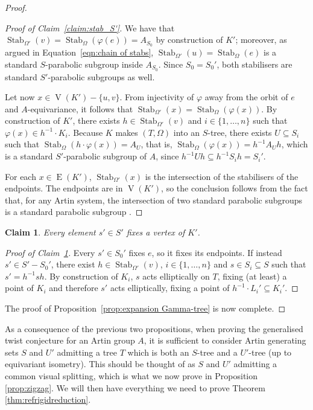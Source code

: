 \documentclass[svgnames]{amsart}
\theoremstyle{plain}
\newtheorem{claim}[thm]{Claim}
\theoremstyle{definition}
\newenvironment{claimproof}{\renewcommand{\qedsymbol}{$\blacksquare$}\begin{proof}}{\end{proof}}
\newcommand{\edge}[1]{\operatorname{E}(#1)}
\newcommand{\Stab}[2]{\operatorname{Stab}_{#1}\left(#2\right)}
\renewcommand{\phi}{\varphi}
\newcommand{\ver}[1]{\operatorname{V}(#1)}
\begin{document}
\begin{proof}
\begin{claimproof}[Proof of Claim~\ref{claim:stab_S'}]
    We have that $\Stab{\Omega'}{v}=\Stab{\Omega}{\phi(e)}=A_{S_0}$ by construction of $K'$; moreover, as argued in Equation~\eqref{eqn:chain of stabs},  $\Stab{\Omega'} u=\Stab{\Omega} e$ is a standard $S$-parabolic subgroup inside $A_{S_0}$. Since $S_0=S_0'$, both stabilisers are standard $S'$-parabolic subgroups as well.\par
    Let now $x\in\ver{K'}-\{u,v\}$. From injectivity of $\phi$ away from the orbit of $e$ and $A$-equivariance, it follows that $\Stab{\Omega'}{x}=\Stab{\Omega}{\phi(x)}$. By construction of $K'$, there exists $h\in\Stab{\Omega'}{v}$ and $i\in\{1,\dots,n\}$ such that $\phi(x) \in h^{-1}\cdot K_i$. Because $K$ makes $(T,\Omega)$ into an $S$-tree, there exists $U\subseteq S_i$ such that $\Stab{\Omega}{h\cdot \phi(x)}=A_U$, that is, $\Stab{\Omega}{\phi(x)}=h^{-1}A_U h$, which is a standard $S'$-parabolic subgroup of $A$, since $h^{-1}Uh\subseteq h^{-1}S_ih=S_i'$.\par
    For each $x \in \edge{K'}$, $\Stab{\Omega'}{x}$ is the intersection of the stabilisers of the endpoints. The endpoints are in $\ver{K'}$, so the conclusion follows from the fact that, for any Artin system, the intersection of two standard parabolic subgroups is a standard parabolic subgroup \cite{VanDerLek}.
\end{claimproof}

    \begin{claim}\label{claim:S'fix}
        Every element $s'\in S'$ fixes a vertex of $K'$.
    \end{claim}

\begin{claimproof}[Proof of Claim~\ref{claim:S'fix}]
    Every $s'\in S_0'$ fixes $e$, so it fixes its endpoints. If instead $s'\in S'-S_0'$, there exist $h\in\Stab{\Omega'}{v}$, $i\in\{1,\dots,n\}$ and $s\in S_i\subseteq S$ such that $s'= h^{-1}sh$. By construction of $K_i$, $s$ acts elliptically on $T$, fixing (at least) a point of $K_i$ and therefore $s'$ acts elliptically, fixing a point of $h^{-1}\cdot L_i'\subseteq K_i'$.
\end{claimproof} 
\noindent The proof of Proposition~\ref{prop:expansion Gamma-tree} is now complete. \end{proof}



\noindent As a consequence of the previous two propositions, when proving the generalised twist conjecture for an Artin group $A$, it is sufficient to consider Artin generating sets $S$ and $U'$ admitting a tree $T$ which is both an $S$-tree and a $U'$-tree (up to equivariant isometry). This should be thought of as $S$ and $U'$ admitting a common visual splitting, which is what we now prove in Proposition \ref{prop:zigzag}. We will then have everything we need to prove Theorem \ref{thm:refrigidreduction}.
\end{document}
